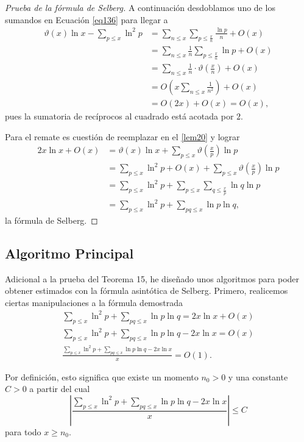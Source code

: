 \documentclass[10pt]{article}
\theoremstyle{definition}
\theoremstyle{remark}
\begin{document}
\begin{proof}[Prueba de la f\'ormula de Selberg]
A continuaci\'on desdoblamos uno de los sumandos en Ecuaci\'on \ref{eq136} para llegar a 
\begin{align}
\vartheta(x)\ln x - \sum_{p \leq x} \ln^2 p &= \sum_{n \leq x} \sum_{p \leq \frac{x}{n}} \frac{\ln p}{n} + O(x) \\
&= \sum_{n \leq x} \frac{1}{n}\sum_{p \leq \frac{x}{n}} \ln p + O(x) \\
&= \sum_{n \leq x} \frac{1}{n}\cdot \vartheta\left(\frac{x}{n}\right) + O(x) \\
&= O\left(x \sum_{n \leq x} \frac{1}{n^2}\right) + O(x) \\
&= O(2x)+O(x)=O(x), 
\end{align}
pues la sumatoria de rec\'iprocos al cuadrado est\'a acotada por $2$. 

Para el remate es cuesti\'on de reemplazar en el \cref{lem20} y lograr  
\begin{align}
2x\ln x + O(x) &= \vartheta(x)\ln x + \sum_{p \leq x} \vartheta\left(\frac{x}{p}\right)\ln p  \\
&= \sum_{p \leq x} \ln^2 p + O(x) + \sum_{p \leq x} \vartheta\left(\frac{x}{p}\right)\ln p  \\
&= \sum_{p \leq x} \ln^2 p + \sum_{p \leq x} \sum_{q \leq \frac{x}{p}} \ln q \ln p  \\
&= \sum_{p \leq x} \ln^2 p + \sum_{pq \leq x} \ln p \ln q, 
\end{align}
la f\'ormula de Selberg.
\end{proof}

\subsection{Algoritmo Principal}
Adicional a la prueba del Teorema 15, he dise\~nado unos algoritmos para poder obtener estimados
con la f\'ormula asint\'otica de Selberg. Primero, realicemos ciertas manipulaciones a la f\'ormula demostrada
\begin{gather*}
\sum_{p \leq x} \ln^2 p + \sum_{pq \leq x} \ln p \ln q = 2x\ln x + O(x) \\
\sum_{p \leq x} \ln^2 p + \sum_{pq \leq x} \ln p \ln q - 2x\ln x = O(x) \\
\frac{\sum_{p \leq x} \ln^2 p + \sum_{pq \leq x} \ln p \ln q - 2x\ln x}{x} = O(1).
\end{gather*}

Por definici\'on, esto significa que existe un momento $n_0 > 0$ y una constante $C > 0$ a partir del cual
$$\left|\frac{\sum_{p \leq x} \ln^2 p + \sum_{pq \leq x} \ln p \ln q - 2x\ln x}{x}\right| \leq C$$
para todo $x \geq n_0$.
\end{document}
